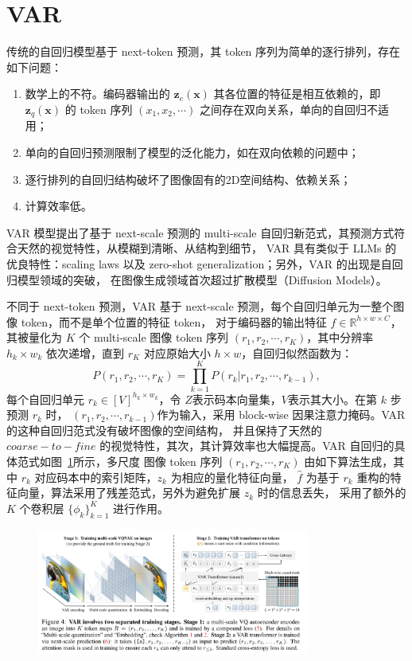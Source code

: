 \section{VAR}

传统的自回归模型基于 next-token 预测，其 token 序列为简单的逐行排列，存在如下问题：
\begin{enumerate}
    \item 数学上的不符。编码器输出的 $\bm{z}_e(\bm{x})$ 其各位置的特征是相互依赖的，即
    $\bm{z}_q(\bm{x})$ 的 token 序列 $(x_1,x_2,\cdots)$ 之间存在双向关系，单向的自回归不适用；
    \item 单向的自回归预测限制了模型的泛化能力，如在双向依赖的问题中；
    \item 逐行排列的自回归结构破坏了图像固有的2D空间结构、依赖关系；
    \item 计算效率低。
\end{enumerate}
VAR 模型提出了基于 next-scale 预测的 multi-scale 自回归新范式，其预测方式符合天然的视觉特性，从模糊到清晰、从结构到细节，
VAR 具有类似于 LLMs 的优良特性：scaling laws 以及 zero-shot generalization；另外，VAR 的出现是自回归模型领域的突破，
在图像生成领域首次超过扩散模型（Diffusion Models）。

不同于 next-token 预测，VAR 基于 next-scale 预测，每个自回归单元为一整个图像 token，而不是单个位置的特征 token，
对于编码器的输出特征 $f\in\mathbb{R}^{h\times w\times C}$，其被量化为 $K$ 个 multi-scale 图像 token 序列
$(r_1,r_2,\cdots,r_K)$，其中分辨率 $h_k\times w_k$ 依次递增，直到 $r_K$ 对应原始大小 $h\times w$，自回归似然函数为：
\begin{equation}
    P(r_1,r_2,\cdots,r_K) = \prod_{k=1}^K P(r_k|r_{1},r_{2},\cdots,r_{k-1}),
\end{equation}
每个自回归单元 $r_k\in[V]^{h_k\times w_k}$，令 $Z$表示码本向量集，$V$表示其大小。在第 $k$ 步预测 $r_k$ 时，
$(r_1,r_2,\cdots,r_{k-1})$作为输入，采用 block-wise 因果注意力掩码。VAR 的这种自回归范式没有破坏图像的空间结构，
并且保持了天然的 $coarse-to-fine$ 的视觉特性，其次，其计算效率也大幅提高。VAR 自回归的具体范式如图~\ref{fig:VAR}所示，多尺度
图像 token 序列 $(r_1,r_2,\cdots,r_K)$ 由如下算法生成，其中 $r_k$ 对应码本中的索引矩阵，$z_k$ 为相应的量化特征向量，
$\hat{f}$ 为基于 $r_k$ 重构的特征向量，算法采用了残差范式，另外为避免扩展 $z_k$ 时的信息丢失，
采用了额外的 $K$ 个卷积层 $\{\phi_k\}_{k=1}^K$ 进行作用。

\begin{figure}[htbp]
    \centering 
    \includegraphics[width=0.8\textwidth]{./fig/VAR.png} 
    \label{fig:VAR} 
\end{figure}

